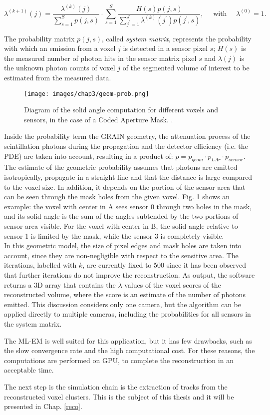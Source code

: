 \begin{equation}
    \lambda^{(k+1)}(j)=\frac{\lambda^{(k)}(j)}{\sum_{s=1}^S p(j, s)} \cdot \sum_{s=1}^S \frac{H(s) p(j, s)}{\sum_{j^{\prime}=1}^J \lambda^{(k)}\left(j^{\prime}\right) p\left(j^{\prime}, s\right)}, \quad \text { with } \quad \lambda^{(0)}=1.
\end{equation}

The probability matrix $p(j,s)$, called \textit{system matrix}, represents the probability with which an emission from a voxel $j$ is detected in a sensor pixel $s$; $H(s)$ is the measured number of photon hits in the sensor matrix pixel $s$ and $\lambda(j)$ is the unknown photon counts of voxel $j$ of the segmented volume of interest to be estimated from the measured data. 

\begin{figure}[h!]
    \centering
    \texttt{[image: images/chap3/geom-prob.png]}
    \caption{Diagram of the solid angle computation for different voxels and sensors, in the case of a Coded Aperture Mask. \cite{tesi-cicero}.}
    \label{fig:geom-prob}
\end{figure}

Inside the probability term the GRAIN geometry, the attenuation process of the scintillation photons during the propagation and the detector efficiency (i.e. the PDE) are taken into account, resulting in a product of: $p = p_{geom} \cdot p_{LAr} \cdot p_{sensor}$. The estimate of the geometric probability assumes that photons are emitted isotropically, propagate in a straight line and that the distance is large compared to the voxel size. In addition, it depends on the portion of the sensor area that can be seen through the mask holes from the given voxel. Fig. \ref{fig:geom-prob} shows an example: the voxel with center in A sees sensor 0 through two holes in the mask, and its solid angle is the sum of the angles subtended by the two portions of sensor area visible. For the voxel with center in B, the solid angle relative to sensor 1 is limited by the mask, while the sensor 3 is completely visible. \\ In this geometric model, the size of pixel edges and mask holes are taken into account, since they are non-negligible with respect to the sensitive area. The iterations, labelled with $k$, are currently fixed to 500 since it has been observed that further iterations do not improve the reconstruction. As output, the software returns a 3D array that contains the $\lambda$ values of the voxel scores of the reconstructed volume, where the score is an estimate of the number of photons emitted. This discussion considers only one camera, but the algorithm can be applied directly to multiple cameras, including the probabilities for all sensors in the system matrix.

The ML-EM is well suited for this application, but it has few drawbacks, such as the slow convergence rate and the high computational cost. For these reasons, the computations are performed on GPU, to complete the reconstruction in an acceptable time.

The next step is the simulation chain is the extraction of tracks from the reconstructed voxel clusters. This is the subject of this thesis and it will be presented in Chap. \ref{reco}.